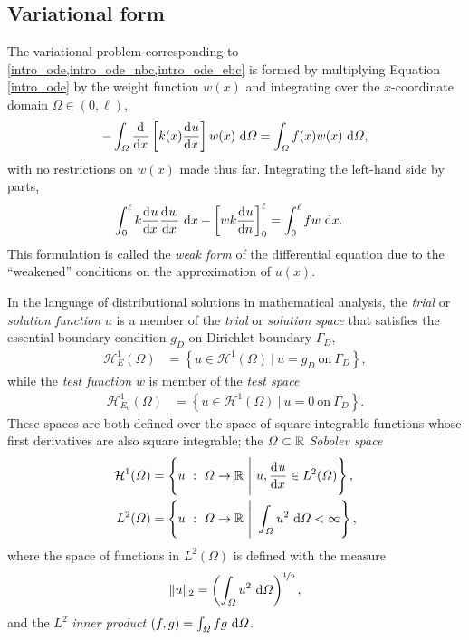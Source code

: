 \subsection{Variational form} \label{ssn_variational_form}

The variational problem  corresponding to \cref{intro_ode,intro_ode_nbc,intro_ode_ebc} is formed by multiplying Equation \cref{intro_ode} by the weight function $w(x)$ and integrating over the $x$-coordinate domain $\Omega \in (0,\ell)$,
$$-\int_{\varOmega} \frac{\mathrm{d}{^{}} }{\mathrm{d} x{^{}} } \left[ k(x) \frac{\mathrm{d}{^{}} u}{\mathrm{d} x{^{}} } \right] w(x) \ \mathrm{d}\varOmega = \int_{\varOmega} f(x) w(x) \ \mathrm{d}\varOmega,$$
with no restrictions on $w(x)$ made thus far.  Integrating the left-hand side by parts,
\begin{align*}
  \int_0^{\ell} k \frac{\mathrm{d}{^{}} u}{\mathrm{d} x{^{}} } \frac{\mathrm{d}{^{}} w}{\mathrm{d} x{^{}} } \ \mathrm{d}x - \left[ wk\frac{\mathrm{d}{^{}} u}{\mathrm{d} n{^{}} }\right]_0^{\ell} &= \int_0^{\ell} f w \ \mathrm{d}x.
\end{align*}
This formulation is called the \emph{weak form}  of the differential equation due to the ``weakened'' conditions on the approximation of $u(x)$.

In the language of distributional solutions in mathematical analysis, the  \emph{trial} or \emph{solution function} $u$ is a member of the \emph{trial} or \emph{solution space} that satisfies the essential boundary condition $g_D$ on Dirichlet boundary $\Gamma_D$,
\begin{align}
  \label{trial_space}
  \mathcal{H}_E^1(\Omega) &= \left\{ u \in \mathcal{H}^1(\Omega)\ |\ u = g_D\ \text{on}\ \Gamma_D \right\},
\end{align}
while the  \emph{test function} $w$ is member of the \emph{test space}
\begin{align}
  \label{test_space}
  \mathcal{H}_{E_0}^1(\Omega) &= \left\{ u \in \mathcal{H}^1(\Omega)\ |\ u = 0\ \text{on}\ \Gamma_D \right\}.
\end{align}
These spaces are both defined over the space of square-integrable functions whose first derivatives are also square integrable; the $\varOmega \subset \mathbb{R}$  \emph{Sobolev space} \citep{elman_2005}
\begin{align}
  \label{sobolev_space}
  \mathcal{H}^1(\Omega) &= \left\{ u\ :\ \Omega \rightarrow \R\ \Bigg|\ u, \totder{u}{x} \in L^2(\Omega) \right\},\\
  \label{l2_space}
  L^2(\Omega) &= \left\{ u\ :\ \Omega \rightarrow \R\ \Bigg|\ \int_{\Omega} u^2 \d{\Omega} < \infty \right\},
\end{align}
where the space of functions in  $L^2(\Omega)$ is defined with the measure
\begin{align}
  \label{l2_norm}
  \Vert u \Vert_2 = \left( \int_{\varOmega} u^2 \ \mathrm{d}\varOmega \right)^{\nicefrac{1}{2}},
\end{align}
and the  $L^2$ \emph{inner product} $(f,g) = \int_{\varOmega} f g \ \mathrm{d}\varOmega$.

